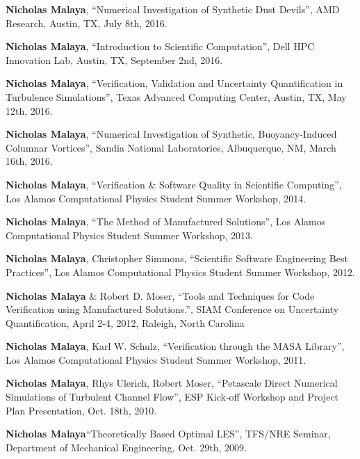 
\textbf{Nicholas Malaya}, ``Numerical Investigation of Synthetic Dust Devils'', AMD Research, 
		 Austin, TX, July 8th, 2016. 

\blankline

\textbf{Nicholas Malaya}, ``Introduction to Scientific Computation'', Dell HPC Innovation Lab, 
		 Austin, TX, September 2nd, 2016. 

\blankline

\textbf{Nicholas Malaya}, ``Verification, Validation and Uncertainty Quantification in Turbulence Simulations'', Texas Advanced Computing Center, 
		 Austin, TX, May 12th, 2016. 

\blankline

\textbf{Nicholas Malaya}, ``Numerical Investigation of Synthetic, Buoyancy-Induced Columnar Vortices'', Sandia National Laboratories, 
		 Albuquerque, NM, March 16th, 2016. 

\blankline

\textbf{Nicholas Malaya}, ``Verification \& Software Quality in Scientific
      Computing'', Los Alamos Computational Physics Student Summer
      Workshop, 2014. 

\blankline

\textbf{Nicholas Malaya}, ``The Method of Manufactured Solutions'', Los Alamos
      Computational Physics Student Summer Workshop, 2013.

\blankline

\textbf{Nicholas Malaya}, Christopher Simmons, ``Scientific Software Engineering
      Best Practices'', Los Alamos Computational Physics Student Summer
      Workshop, 2012.

\blankline

\textbf{Nicholas Malaya} \& Robert D. Moser, ``Tools and Techniques for Code
Verification using Manufactured Solutions.'', SIAM Conference on
Uncertainty Quantification, April 2-4, 2012, Raleigh, North Carolina 

\blankline

\textbf{Nicholas Malaya}, Karl W. Schulz, ``Verification through the MASA
      Library'', Los Alamos Computational Physics Student Summer
      Workshop, 2011.

\blankline

\textbf{Nicholas Malaya}, Rhys Ulerich, Robert Moser, ``Petascale Direct
Numerical Simulations of Turbulent Channel Flow'', ESP Kick-off
Workshop and Project Plan Presentation, Oct. 18th, 2010.

\blankline

\textbf{Nicholas Malaya}``Theoretically Based Optimal LES'', TFS/NRE
Seminar, Department of Mechanical Engineering, Oct. 29th, 2009. 



